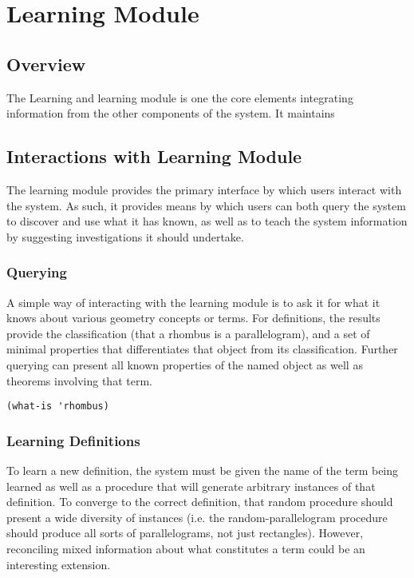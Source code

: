 \chapter{Learning Module}
\label{chap:learning}

\section{Overview}

The Learning and learning module is one the core elements integrating
information from the other components of the system. It maintains

\section{Interactions with Learning Module}

The learning module provides the primary interface by which users
interact with the system. As such, it provides means by which users
can both query the system to discover and use what it has known, as
well as to teach the system information by suggesting investigations
it should undertake.

\subsection{Querying}

A simple way of interacting with the learning module is to ask it for
what it knows about various geometry concepts or terms. For
definitions, the results provide the classification (that a rhombus is
a parallelogram), and a set of minimal properties that differentiates
that object from its classification. Further querying can present all
known properties of the named object as well as theorems involving
that term.

\begin{verbatim}
(what-is 'rhombus)
\end{verbatim}

\subsection{Learning Definitions}

To learn a new definition, the system must be given the name of the
term being learned as well as a procedure that will generate arbitrary
instances of that definition. To converge to the correct definition,
that random procedure should present a wide diversity of instances
(i.e. the random-parallelogram procedure should produce all sorts of
parallelograms, not just rectangles). However, reconciling mixed
information about what constitutes a term could be an interesting
extension.


